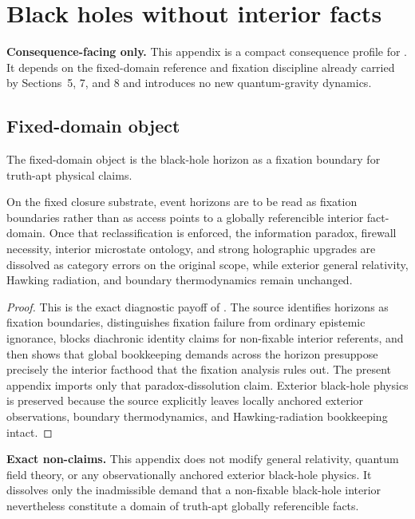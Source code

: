 \section{Black holes without interior facts}
\label{app:black-holes}

\begin{fixedbox}
\textbf{Consequence-facing only.} This appendix is a compact consequence profile for \blackholesdoc{}. It depends on the fixed-domain reference and fixation discipline already carried by Sections~5, 7, and 8 and introduces no new quantum-gravity dynamics.
\end{fixedbox}

\subsection*{Fixed-domain object}
The fixed-domain object is the black-hole horizon as a fixation boundary for truth-apt physical claims.

\begin{proposition}
On the fixed closure substrate, event horizons are to be read as fixation boundaries rather than as access points to a globally referencible interior fact-domain. Once that reclassification is enforced, the information paradox, firewall necessity, interior microstate ontology, and strong holographic upgrades are dissolved as category errors on the original scope, while exterior general relativity, Hawking radiation, and boundary thermodynamics remain unchanged.
\end{proposition}

\begin{proof}
This is the exact diagnostic payoff of \blackholesdoc{}. The source identifies horizons as fixation boundaries, distinguishes fixation failure from ordinary epistemic ignorance, blocks diachronic identity claims for non-fixable interior referents, and then shows that global bookkeeping demands across the horizon presuppose precisely the interior facthood that the fixation analysis rules out. The present appendix imports only that paradox-dissolution claim. Exterior black-hole physics is preserved because the source explicitly leaves locally anchored exterior observations, boundary thermodynamics, and Hawking-radiation bookkeeping intact.\cite{MaleyBlackHoles}
\end{proof}

\begin{reviewbox}
\textbf{Exact non-claims.} This appendix does not modify general relativity, quantum field theory, or any observationally anchored exterior black-hole physics. It dissolves only the inadmissible demand that a non-fixable black-hole interior nevertheless constitute a domain of truth-apt globally referencible facts.\cite{MaleyBlackHoles}
\end{reviewbox}
